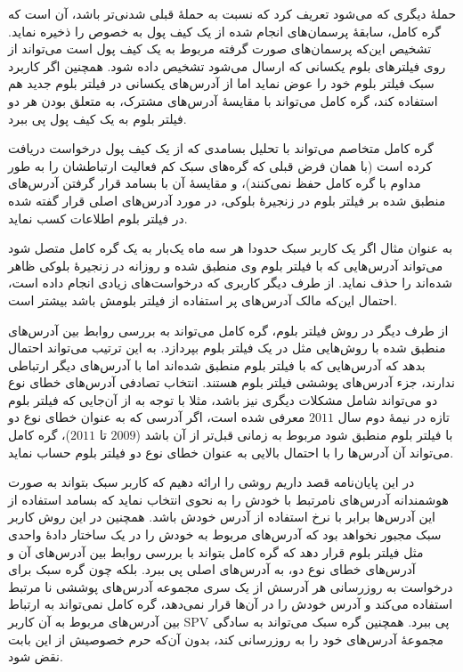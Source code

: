 حملهٔ دیگری که می‌شود تعریف کرد که نسبت به حملهٔ قبلی شدنی‌تر باشد، آن است که گره کامل، سابقهٔ پرسمان‌های انجام شده از یک کیف پول به خصوص را ذخیره نماید. تشخیص این‌که پرسمان‌های صورت گرفته مربوط به یک کیف پول است می‌تواند از روی فیلتر‌های بلوم یکسانی که ارسال می‌شود تشخیص داده شود. همچنین اگر کاربرد سبک فیلتر بلوم خود را عوض نماید اما از آدرس‌های یکسانی در فیلتر بلوم جدید هم استفاده کند،‌ گره کامل می‌تواند با مقایسهٔ آدرس‌های مشترک، به متعلق بودن هر دو فیلتر بلوم به یک کیف پول پی ببرد.

گره کامل متخاصم می‌تواند با تحلیل بسامدی که از یک کیف پول درخواست دریافت کرده است (با همان فرض قبلی که گره‌های سبک کم فعالیت ارتباطشان را به طور مداوم با گره کامل حفظ نمی‌کنند)، و مقایسهٔ آن با بسامد قرار گرفتن آدرس‌های منطبق شده بر فیلتر بلوم در زنجیرهٔ بلوکی، در مورد آدرس‌های اصلی قرار گفته شده در فیلتر بلوم اطلاعات کسب نماید.

به عنوان مثال اگر یک کاربر سبک حدودا هر سه ماه یک‌بار به یک گره کامل متصل شود می‌تواند آدرس‌هایی که با فیلتر بلوم وی منطبق شده و روزانه در زنجیرهٔ بلوکی ظاهر شده‌اند را حذف نماید. از طرف دیگر کاربری که درخواست‌های زیادی انجام داده است، احتمال این‌که مالک آدرس‌های پر استفاده از فیلتر بلومش باشد بیشتر است. 

از طرف دیگر در روش فیلتر بلوم، گره کامل می‌تواند به بررسی روابط بین آدرس‌های منطبق شده با روش‌هایی مثل \cite{Meiklejohn2013} در یک فیلتر بلوم بپردازد. به این ترتیب می‌تواند احتمال بدهد که آدرس‌هایی که با فیلتر بلوم منطبق شده‌اند اما با آدرس‌های دیگر ارتباطی ندارند، جزء آدرس‌های پوششی فیلتر بلوم هستند\cite{Gervais2014}.  انتخاب تصادفی آدرس‌های خطای نوع دو می‌تواند شامل مشکلات دیگری نیز باشد، مثلا با توجه به \cite{Gervais2014} از آن‌جایی که فیلتر بلوم تازه در نیمهٔ دوم سال $2011$ معرفی شده است، اگر آدرسی که به عنوان خطای نوع دو با فیلتر بلوم منطبق شود مربوط به زمانی قبل‌تر از آن باشد ($2009$ تا $2011$)، گره کامل می‌تواند آن آدرس‌ها را با احتمال بالایی به عنوان خطای نوع دو فیلتر بلوم حساب نماید.

در این پایان‌نامه قصد داریم روشی را ارائه دهیم که کاربر سبک بتواند به صورت هوشمندانه آدرس‌های نامرتبط با خودش را به نحوی انتخاب نماید که بسامد استفاده از این آدرس‌ها برابر با نرخ استفاده از آدرس خودش باشد. همچنین در این روش کاربر سبک مجبور نخواهد بود که آدرس‌های مربوط به خودش را در یک ساختار دادهٔ واحدی مثل فیلتر بلوم قرار دهد که گره کامل بتواند با بررسی روابط بین آدرس‌های آن و آدرس‌های خطای نوع دو،‌ به آدرس‌های اصلی پی ببرد. بلکه چون گره سبک برای درخواست به روزرسانی هر آدرسش از یک سری مجموعه آدرس‌های پوششی نا مرتبط استفاده می‌کند و آدرس خودش را در آن‌ها قرار نمی‌دهد، گره کامل نمی‌تواند به ارتباط بین آدرس‌های مربوط به آن کاربر SPV پی ببرد. همچنین گره سبک می‌تواند به سادگی مجموعهٔ آدرس‌های خود را به روزرسانی کند، بدون آن‌که حرم خصوصیش از این بابت نقض شود. 




